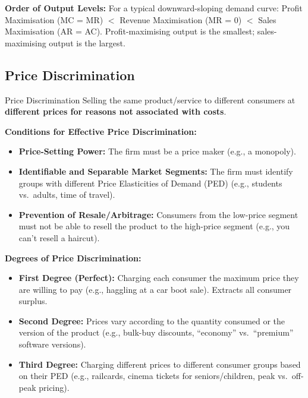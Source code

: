 \documentclass[11pt, a4paper, twoside]{book}
\begin{document}
\begin{coreidea}
\textbf{Order of Output Levels:} For a typical downward-sloping demand curve: Profit Maximisation (MC = MR) $<$ Revenue Maximisation (MR = 0) $<$ Sales Maximisation (AR = AC). Profit-maximising output is the smallest; sales-maximising output is the largest.
\end{coreidea}

\subsection{Price Discrimination}

\begin{keyterm}{Price Discrimination}
Selling the same product/service to different consumers at \textbf{different prices for reasons not associated with costs}.
\end{keyterm}

\textbf{Conditions for Effective Price Discrimination:}
\begin{itemize}
  \item \textbf{Price-Setting Power:} The firm must be a price maker (e.g., a monopoly).
  \item \textbf{Identifiable and Separable Market Segments:} The firm must identify groups with different Price Elasticities of Demand (PED) (e.g., students vs.\ adults, time of travel).
  \item \textbf{Prevention of Resale/Arbitrage:} Consumers from the low-price segment must not be able to resell the product to the high-price segment (e.g., you can't resell a haircut).
\end{itemize}

\textbf{Degrees of Price Discrimination:}
\begin{itemize}
  \item \textbf{First Degree (Perfect):} Charging each consumer the maximum price they are willing to pay (e.g., haggling at a car boot sale). Extracts all consumer surplus.
  \item \textbf{Second Degree:} Prices vary according to the quantity consumed or the version of the product (e.g., bulk-buy discounts, ``economy'' vs.\ ``premium'' software versions).
  \item \textbf{Third Degree:} Charging different prices to different consumer groups based on their PED (e.g., railcards, cinema tickets for seniors/children, peak vs.\ off-peak pricing).
\end{itemize}
\end{document}
